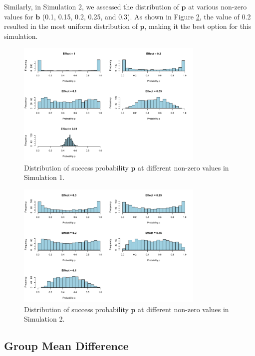 \documentclass[12pt]{article}
\begin{document}
Similarly, in Simulation 2, we assessed the distribution of \( \mathbf{p} \) at various non-zero values for \( \mathbf{b} \) (0.1, 0.15, 0.2, 0.25, and 0.3). As shown in Figure \ref{fig:sim2_p_dist}, the value of 0.2 resulted in the most uniform distribution of \( \mathbf{p} \), making it the best option for this simulation.

\begin{figure}[h!]
	\centering
	\includegraphics[width=0.8\textwidth]{sim1_p_dist.png}
  \caption{Distribution of success probability \( \mathbf{p} \) at different non-zero values in Simulation 1.}
	\label{fig:sim1_p_dist}
\end{figure}

\begin{figure}[h!]
	\centering
	\includegraphics[width=0.8\textwidth]{sim2_p_dist.png}
  \caption{Distribution of success probability \( \mathbf{p} \) at different non-zero values in Simulation 2.}
	\label{fig:sim2_p_dist}
\end{figure}

\FloatBarrier

\subsection*{Group Mean Difference}
\end{document}
